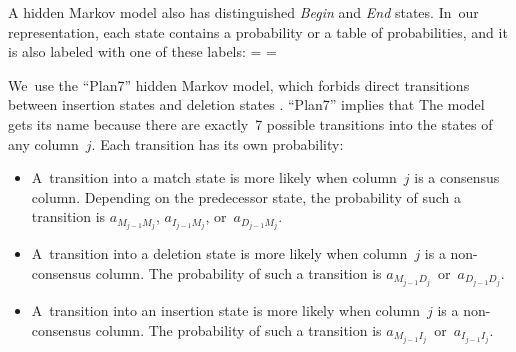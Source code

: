 \documentclass[preprint,nonatbib,blockstyle,times]{sigplanconf}
\newcommand\txprobj[3][]{a#1_{{#2}_{j-1}{#3}_j}}
\newcommand\txprobjj[3][]{a#1_{{#2}_{j-1}{#3}_j}}
\newif\ifverbatimsmall
\newcommand\smallverbatiminput[1]{%
  \verbatimsmalltrue
  \presvtopsep=\topsep
  \topsep=0.78\topsep
  \verbatimsmallfalse
  \topsep=\presvtopsep
}
\let\cite\citep
\begin{document}
A hidden Markov model also has distinguished \emph{Begin} and \emph{End} states.
In~our representation, each state contains a probability or a table of
probabilities, and it is also labeled with one of these labels:
\smallverbatiminput{statelabel}


We~use the ``Plan7'' hidden Markov model, which forbids direct
transitions between insertion 
states and deletion states \cite{Eddy:1998ut}. 
\ifpagetuning
``Plan7'' implies that
\else
The model gets its name because
\fi
 there are exactly~7 possible transitions
into the states of any column~$j$.
Each transition has its own probability:
\begin{itemize} 
\item
A~transition into a match state 
is more likely when column~$j$ is a consensus column.
Depending on the predecessor state, 
the probability of such a transition is 
$\txprobj M M$, $\txprobj I M$, or~$\txprobj D M$.
\item
A~transition into a deletion state 
is more likely when column~$j$ is a non-consensus column.
The probability of such a transition is 
$\txprobj M D$~or~$\txprobj D D$.
\item
A~transition into an insertion state 
is more likely when column~$j$ is a non-consensus column.
The probability of such a transition is 
$\txprobjj M I$~or~$\txprobjj I I$.
\end{itemize}
\end{document}

